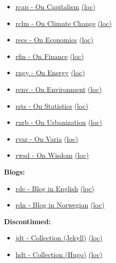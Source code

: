 \documentclass[
]{book}
\providecommand{\tightlist}{%
  \setlength{\itemsep}{0pt}\setlength{\parskip}{0pt}}
\begin{document}
\begin{itemize}
\tightlist
\item
  \href{https://dyrehaugen.github.io/rcap}{rcap - On Capitalism} \href{http://localhost/rcap}{(loc)}
\item
  \href{https://dyrehaugen.github.io/rclm}{rclm - On Climate Change} \href{http://localhost/rclm}{(loc)}
\item
  \href{https://dyrehaugen.github.io/recs}{recs - On Economics} \href{http://localhost/recs}{(loc)}
\item
  \href{https://dyrehaugen.github.io/rngy}{rfin - On Finance} \href{http://localhost/rfin}{(loc)}
\item
  \href{https://dyrehaugen.github.io/rngy}{rngy - On Energy} \href{http://localhost/rngy}{(loc)}
\item
  \href{https://dyrehaugen.github.io/renv}{renv - On Environment} \href{http://localhost/renv}{(loc)}
\item
  \href{https://dyrehaugen.github.io/rsts}{rsts - On Statistics} \href{http://localhost/rsts}{(loc)}
\item
  \href{https://dyrehaugen.github.io/rurb}{rurb - On Urbanization} \href{http://localhost/rurb}{(loc)}
\item
  \href{https://dyrehaugen.github.io/rvar}{rvar - On Varia} \href{http://localhost/rvar}{(loc)}
\item
  \href{https://dyrehaugen.github.io/rwsd}{rwsd - On Wisdom} \href{http://localhost/rwsd}{(loc)}
\end{itemize}

\textbf{Blogs:}

\begin{itemize}
\tightlist
\item
  \href{https://dyrehaugen.github.io/rde}{rde - Blog in English} \href{http://localhost/rde}{(loc)}
\item
  \href{https://dyrehaugen.github.io/rdn}{rdn - Blog in Norwegian} \href{http://localhost/rdn}{(loc)}
\end{itemize}

\textbf{Discontinued:}

\begin{itemize}
\tightlist
\item
  \href{https://dyrehaugen.github.io/jdt}{jdt - Collection (Jekyll)} \href{http://localhost/jdt}{(loc)}
\item
  \href{https://dyrehaugen.github.io/hdt}{hdt - Collection (Hugo)} \href{http://localhost/hdt}{(loc)}
\end{itemize}
\end{document}
